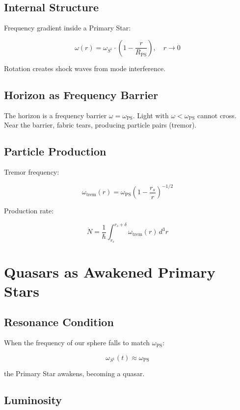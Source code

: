 \documentclass[12pt,a4paper]{article}
\begin{document}
\subsection{Internal Structure}

Frequency gradient inside a Primary Star:

\[
\omega(r) = \omega_{S^1} \cdot \left(1 - \frac{r}{R_{\text{PS}}}\right), \quad r \to 0
\]

Rotation creates shock waves from mode interference.

\subsection{Horizon as Frequency Barrier}

The horizon is a frequency barrier \(\omega = \omega_{\text{PS}}\). Light with \(\omega < \omega_{\text{PS}}\) cannot cross. Near the barrier, fabric tears, producing particle pairs (tremor).

\subsection{Particle Production}

Tremor frequency:

\[
\omega_{\text{trem}}(r) = \omega_{\text{PS}} \left(1 - \frac{r_s}{r}\right)^{-1/2}
\]

Production rate:

\[
\dot{N} = \frac{1}{\hbar} \int_{r_s}^{r_s+\delta} \omega_{\text{trem}}(r) \, d^3r
\]

\section{Quasars as Awakened Primary Stars}

\subsection{Resonance Condition}

When the frequency of our sphere falls to match \(\omega_{\text{PS}}\):

\[
\omega_{S^1}(t) \approx \omega_{\text{PS}}
\]

the Primary Star awakens, becoming a quasar.

\subsection{Luminosity}
\end{document}
